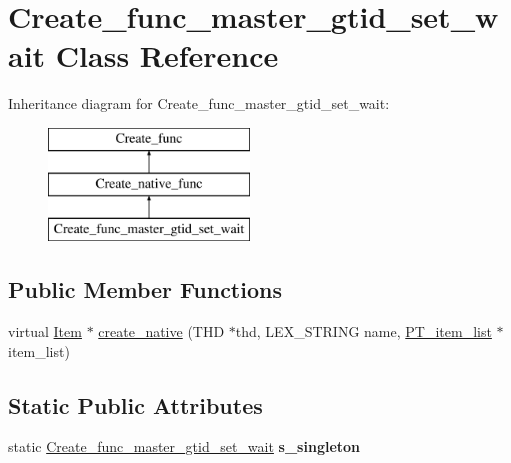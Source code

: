 \hypertarget{classCreate__func__master__gtid__set__wait}{}\section{Create\+\_\+func\+\_\+master\+\_\+gtid\+\_\+set\+\_\+wait Class Reference}
\label{classCreate__func__master__gtid__set__wait}
Inheritance diagram for Create\+\_\+func\+\_\+master\+\_\+gtid\+\_\+set\+\_\+wait\+:\begin{figure}[H]
\begin{center}
\leavevmode
\includegraphics[height=3.000000cm]{classCreate__func__master__gtid__set__wait}
\end{center}
\end{figure}
\subsection*{Public Member Functions}
\begin{DoxyCompactItemize}
\item 
virtual \mbox{\hyperlink{classItem}{Item}} $\ast$ \mbox{\hyperlink{classCreate__func__master__gtid__set__wait_a065b81f5ebe1464cb88b799e078e7f4f}{create\+\_\+native}} (T\+HD $\ast$thd, L\+E\+X\+\_\+\+S\+T\+R\+I\+NG name, \mbox{\hyperlink{classPT__item__list}{P\+T\+\_\+item\+\_\+list}} $\ast$item\+\_\+list)
\end{DoxyCompactItemize}
\subsection*{Static Public Attributes}
\begin{DoxyCompactItemize}
\item 
\mbox{\label{classCreate__func__master__gtid__set__wait_a91bc4d411710e88bbee36000a6c6efec}} 
static \mbox{\hyperlink{classCreate__func__master__gtid__set__wait}{Create\+\_\+func\+\_\+master\+\_\+gtid\+\_\+set\+\_\+wait}} {\bfseries s\+\_\+singleton}
\end{DoxyCompactItemize}

